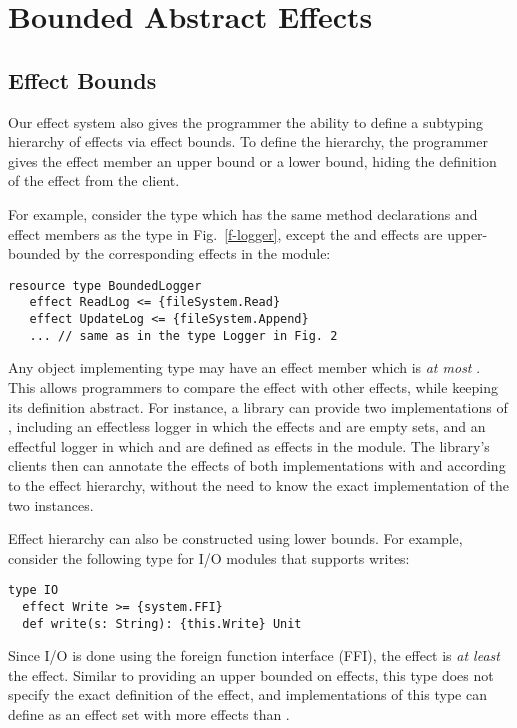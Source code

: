 \chapter{Bounded Abstract Effects}
\label{chapter-bound}

\section{Effect Bounds}
\label{sec-bound}

Our effect system also gives the programmer the ability to define a subtyping hierarchy of effects via effect bounds. To define the hierarchy, the programmer gives the effect member an upper bound or a lower bound, hiding the definition of the effect from the client.

For example, consider the type  which has the same method declarations and effect members as the type  in Fig.~\ref{f-logger}, except the  and  effects are upper-bounded by the corresponding effects in the  module:

\begin{minipage}{\linewidth}
\begin{lstlisting}[xleftmargin=-5pt, numbers=none]
resource type BoundedLogger
   effect ReadLog <= {fileSystem.Read}
   effect UpdateLog <= {fileSystem.Append}
   ... // same as in the type Logger in Fig. 2
\end{lstlisting}
\end{minipage}
Any object implementing type  may have an effect member  which is \textit{at most} . This allows programmers to compare the  effect with other effects, while keeping its definition abstract. For instance, a library can provide two implementations of , including an effectless logger in which the effects  and  are empty sets, and an effectful logger in which  and  are defined as effects in the  module. The library's clients then can annotate the effects of both implementations with  and  according to the effect hierarchy, without the need to know the exact implementation of the two instances.

Effect hierarchy can also be constructed using lower bounds. For example, consider the following type for I/O modules that supports writes:

\begin{minipage}{\linewidth}
\begin{lstlisting}[xleftmargin=-5pt, numbers=none]
type IO
  effect Write >= {system.FFI}
  def write(s: String): {this.Write} Unit
\end{lstlisting}
\end{minipage}
Since I/O is done using the foreign function interface (FFI), the  effect is \textit{at least} the  effect. Similar to providing an upper bounded on effects, this type does not specify the exact definition of the  effect, and implementations of this type can define  as an effect set with more effects than .

